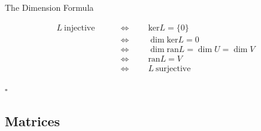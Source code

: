 \documentclass[smaller,hyperref={CJKbookmarks=true}]{beamer}
\begin{document}
\begin{frame}{The Dimension Formula}
\begin{spacing}{1}
\begin{center}
\begin{equation*}
\begin{split}
       L~\text{injective}\qquad&\Leftrightarrow \qquad\text{ker}L=\{0\}\\
         &\Leftrightarrow\qquad\dim\text{ker}L=0  \\
         &\Leftrightarrow\qquad\dim\text{ran}L=\dim U=\dim V  \\
         &\Leftrightarrow\qquad\text{ran}L=V  \\
         &\Leftrightarrow\qquad L~\text{surjective}
    \end{split}
  \end{equation*}
\end{center}
\begin{flushright}
  $\square$
\end{flushright}
\end{spacing}
\end{frame}
\subsection{Matrices}
\begin{frame}[c]
\begin{spacing}{2.5}
\tableofcontents[sectionstyle=hide,subsectionstyle=show/shaded/hide] \end{spacing}
\end{frame}
\end{document}

